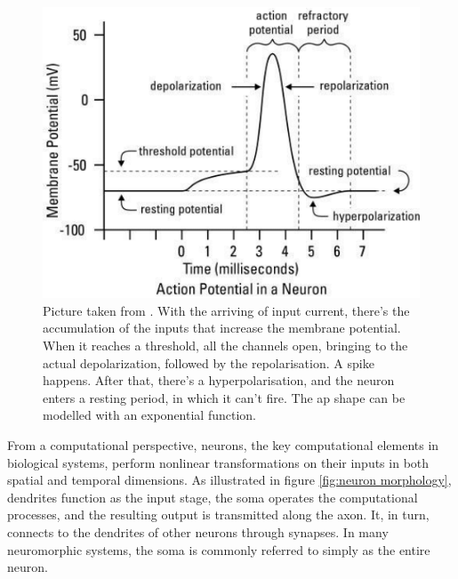 \begin{figure}[hbt!]
    \begin{center}
    \includegraphics[width=0.7\linewidth]{img/Diagram-for-action-potential.png}
    \end{center}
    \caption[Shape of the Action Potential]{Picture taken from \cite{Sharma}. 
    With the arriving of input current, there’s the accumulation of the inputs that increase the membrane potential. When it reaches a threshold, all the channels open, bringing to the actual depolarization, followed by the repolarisation. A spike happens. After that, there’s a hyperpolarisation, and the neuron enters a resting period, in which it can’t fire. The \acrshort{ap} shape can be modelled with an exponential function.}
    \label{fig:spike}
\end{figure}

From a computational perspective, neurons, 
the key computational elements in biological 
systems, perform nonlinear transformations on 
their inputs in both spatial and temporal 
dimensions. As illustrated in 
figure \ref{fig:neuron morphology}, 
dendrites function as the input stage, 
the soma operates the computational processes, 
and the resulting output
is transmitted along the axon. It, 
in turn, connects to the dendrites of other 
neurons through synapses. In many neuromorphic 
systems, the soma is commonly referred to 
simply as the entire neuron.\\

